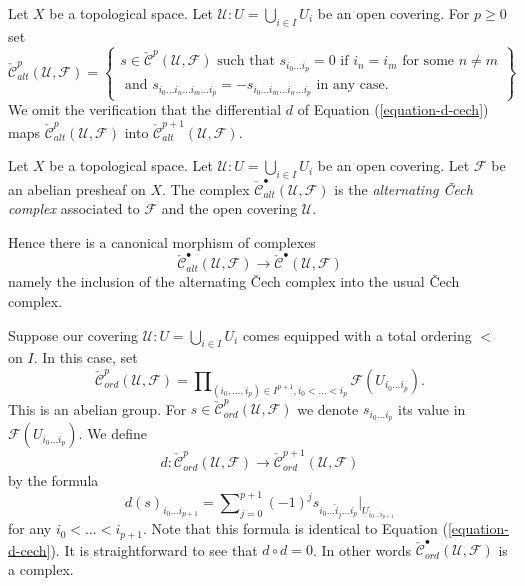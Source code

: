\medskip\noindent
Let $X$ be a topological space. Let $\mathcal{U} : U = \bigcup_{i \in I} U_i$
be an open covering. For $p \geq 0$ set
$$
\check{\mathcal{C}}_{alt}^p(\mathcal{U}, \mathcal{F})
=
\left\{
\begin{matrix}
s \in  \check{\mathcal{C}}^p(\mathcal{U}, \mathcal{F})
\text{ such that }
s_{i_0 \ldots i_p} = 0 \text{ if } i_n = i_m \text{ for some } n \not = m\\
\text{ and }
s_{i_0\ldots i_n \ldots i_m \ldots i_p}
=
-s_{i_0\ldots i_m \ldots i_n \ldots i_p}
\text{ in any case.}
\end{matrix}
\right\}
$$
We omit the verification that the differential $d$ of
Equation (\ref{equation-d-cech}) maps
$\check{\mathcal{C}}^p_{alt}(\mathcal{U}, \mathcal{F})$ into
$\check{\mathcal{C}}^{p + 1}_{alt}(\mathcal{U}, \mathcal{F})$.

\begin{definition}
\label{definition-alternating-cech-complex}
Let $X$ be a topological space. Let $\mathcal{U} : U = \bigcup_{i \in I} U_i$
be an open covering. Let $\mathcal{F}$ be an abelian presheaf on $X$.
The complex $\check{\mathcal{C}}_{alt}^\bullet(\mathcal{U}, \mathcal{F})$
is the {\it alternating {\v C}ech complex} associated to $\mathcal{F}$ and the
open covering $\mathcal{U}$.
\end{definition}

\noindent
Hence there is a canonical morphism of complexes
$$
\check{\mathcal{C}}_{alt}^\bullet(\mathcal{U}, \mathcal{F})
\longrightarrow
\check{\mathcal{C}}^\bullet(\mathcal{U}, \mathcal{F})
$$
namely the inclusion of the alternating {\v C}ech complex into the
usual {\v C}ech complex.

\medskip\noindent
Suppose our covering $\mathcal{U} : U = \bigcup_{i \in I} U_i$ comes
equipped with a total ordering $<$ on $I$. In this case, set
$$
\check{\mathcal{C}}_{ord}^p(\mathcal{U}, \mathcal{F})
=
\prod\nolimits_{(i_0, \ldots, i_p) \in I^{p + 1}, i_0 < \ldots < i_p}
\mathcal{F}(U_{i_0\ldots i_p}).
$$
This is an abelian group. For
$s \in \check{\mathcal{C}}_{ord}^p(\mathcal{U}, \mathcal{F})$ we denote
$s_{i_0\ldots i_p}$ its value in $\mathcal{F}(U_{i_0\ldots i_p})$.
We define
$$
d : \check{\mathcal{C}}_{ord}^p(\mathcal{U}, \mathcal{F})
\longrightarrow
\check{\mathcal{C}}_{ord}^{p + 1}(\mathcal{U}, \mathcal{F})
$$
by the formula
$$
d(s)_{i_0\ldots i_{p + 1}}
=
\sum\nolimits_{j = 0}^{p + 1}
(-1)^j
s_{i_0\ldots \hat i_j \ldots i_p}|_{U_{i_0\ldots i_{p + 1}}}
$$
for any $i_0 < \ldots < i_{p + 1}$. Note that this formula is identical
to Equation (\ref{equation-d-cech}).
It is straightforward to see that $d \circ d = 0$. In other words
$\check{\mathcal{C}}_{ord}^\bullet(\mathcal{U}, \mathcal{F})$ is a complex.

